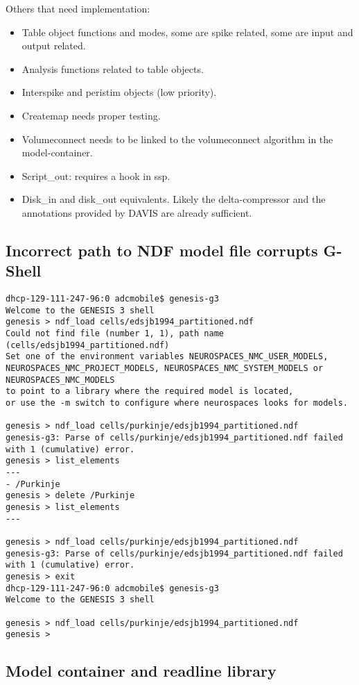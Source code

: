 \documentclass[12pt]{article}
\begin{document}
Others that need implementation:

\begin{itemize}
\item Table object functions and modes, some are spike related, some
  are input and output related.
\item Analysis functions related to table objects.
\item Interspike and peristim objects (low priority).
\item Createmap needs proper testing.
\item Volumeconnect needs to be linked to the volumeconnect algorithm
  in the model-container.
\item Script\_out: requires a hook in ssp.
\item Disk\_in and disk\_out equivalents.  Likely the delta-compressor
  and the annotations provided by DAVIS are already sufficient.
\end{itemize}

\subsection{Incorrect path to NDF model file corrupts G-Shell}
\begin{verbatim}
dhcp-129-111-247-96:0 adcmobile$ genesis-g3
Welcome to the GENESIS 3 shell
genesis > ndf_load cells/edsjb1994_partitioned.ndf
Could not find file (number 1, 1), path name (cells/edsjb1994_partitioned.ndf)
Set one of the environment variables NEUROSPACES_NMC_USER_MODELS,
NEUROSPACES_NMC_PROJECT_MODELS, NEUROSPACES_NMC_SYSTEM_MODELS or NEUROSPACES_NMC_MODELS
to point to a library where the required model is located,
or use the -m switch to configure where neurospaces looks for models.

genesis > ndf_load cells/purkinje/edsjb1994_partitioned.ndf
genesis-g3: Parse of cells/purkinje/edsjb1994_partitioned.ndf failed with 1 (cumulative) error.
genesis > list_elements
---
- /Purkinje
genesis > delete /Purkinje
genesis > list_elements
---

genesis > ndf_load cells/purkinje/edsjb1994_partitioned.ndf
genesis-g3: Parse of cells/purkinje/edsjb1994_partitioned.ndf failed with 1 (cumulative) error.
genesis > exit
dhcp-129-111-247-96:0 adcmobile$ genesis-g3
Welcome to the GENESIS 3 shell

genesis > ndf_load cells/purkinje/edsjb1994_partitioned.ndf
genesis >
\end{verbatim}

\subsection{Model container and readline library}
\end{document}

